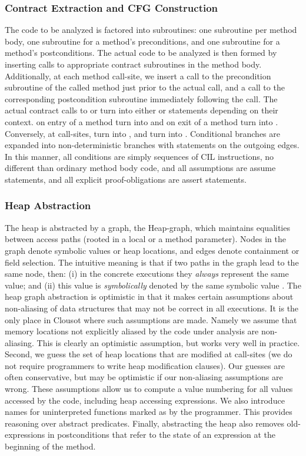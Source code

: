 \documentclass{llncs}
\begin{document}
\subsubsection{Contract Extraction and CFG Construction}
The code to be analyzed is factored into subroutines:  one subroutine per method body, one subroutine for a method's preconditions, and one subroutine for a method's postconditions. 
The actual code to be analyzed is then formed by inserting calls to appropriate contract subroutines in the method body. 
Additionally, at each method call-site, we insert a call to the precondition subroutine of the called method just prior to the actual call, and a call to the corresponding postcondition subroutine immediately following the call.
The actual contract calls to  or  turn into either  or  statements depending on their context. 
 on entry of a method turn into  and  on exit of a method turn into .
Conversely, at call-sites,  turn into , and  turn into . 
Conditional branches are expanded into non-deterministic branches with  statements on the outgoing edges. 
In this manner, all conditions are simply sequences of CIL instructions, no different than ordinary method body code, and all assumptions are assume statements, and all explicit proof-obligations are assert statements.

\subsubsection{Heap Abstraction}
The heap is abstracted by a graph, the Heap-graph, which maintains equalities between access paths (rooted in a local or a method parameter). 
Nodes in the graph denote symbolic values or heap locations, and edges denote containment or field selection.  
The intuitive meaning is that if two paths in the graph lead to the same node, then: (i) in the concrete executions they \emph{always} represent the same value; and (ii) this value is \emph{symbolically} denoted by the same symbolic value .  
The heap graph abstraction is optimistic in that it makes certain assumptions about non-aliasing of data structures that may not be correct in all executions. 
It is the only place in Clousot where such assumptions are made.
Namely we assume that memory locations not explicitly aliased by the code under analysis are non-aliasing. 
This is clearly an optimistic assumption, but works very well in practice.
Second, we guess the set of heap locations that are modified at call-sites (we do not require programmers to write heap modification clauses). 
Our guesses are often conservative, but may be optimistic if our non-aliasing assumptions are wrong. 
These assumptions allow us to compute a value numbering for all values accessed by the code, including heap accessing expressions. 
We also introduce names for uninterpreted functions marked as \code{[Pure]} by the programmer. 
This provides reasoning over abstract predicates. 
Finally, abstracting the heap also removes old-expressions in postconditions that refer to the state of an expression at the beginning of the method.
\end{document}
